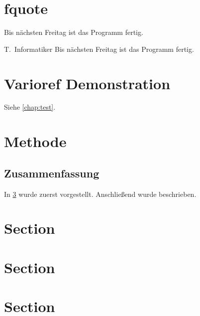 \documentclass[paper=a5,twoside,fontsize=10pt, DIV=calc, headings=small,bibliography=totoc, listof=totoc]{scrbook}
\begin{document}
\section{fquote}

\begin{fquote}[T.\ Informatiker]
Bis nächsten Freitag ist das Programm fertig.
\end{fquote}

\begin{gfquote}{T.\ Informatiker}
Bis nächsten Freitag ist das Programm fertig.
\end{gfquote}


\section{Varioref Demonstration}
Siehe \vref{chap:test}.

\section{Methode}
\label{sec:method}

\label{sec:rqa}
\blindtext

\blindtext

\subsection{Zusammenfassung}
In \cref{sec:method} wurde zuerst  vorgestellt.
Anschließend wurde  beschrieben.

\section{Section}

\section{Section}

\section{Section}
\end{document}

